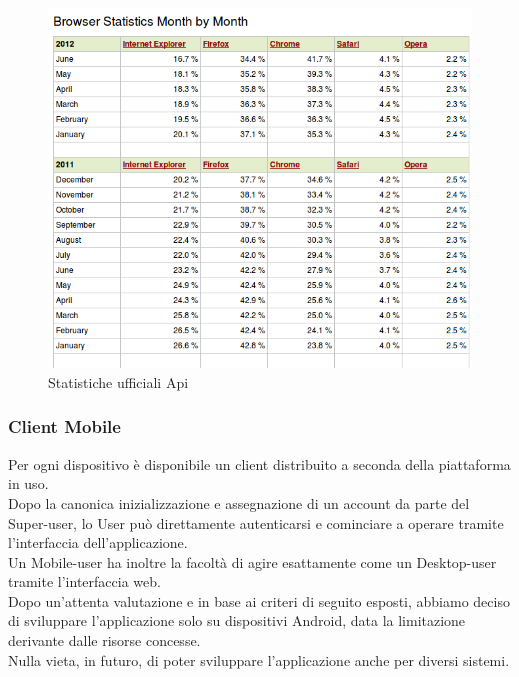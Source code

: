 \begin{figure}[H]
\centering
\caption{Statistiche ufficiali Api}
\includegraphics[scale=0.55]{images/cap1/internetStat} 
\end{figure}


\subsubsection{Client Mobile}
Per ogni dispositivo è disponibile un client distribuito a seconda della piattaforma in uso.\\
Dopo la canonica inizializzazione e assegnazione di un account da parte del Super-user, lo User può direttamente autenticarsi e cominciare a operare tramite l’interfaccia dell’applicazione.\\ 
Un Mobile-user ha inoltre la facoltà di agire esattamente come un Desktop-user tramite l’interfaccia web.\\
Dopo un'attenta valutazione e in base ai criteri di seguito esposti, abbiamo deciso di sviluppare l'applicazione solo su dispositivi Android, data la limitazione derivante dalle risorse concesse.\\
Nulla vieta, in futuro, di poter sviluppare l'applicazione anche per diversi sistemi.

